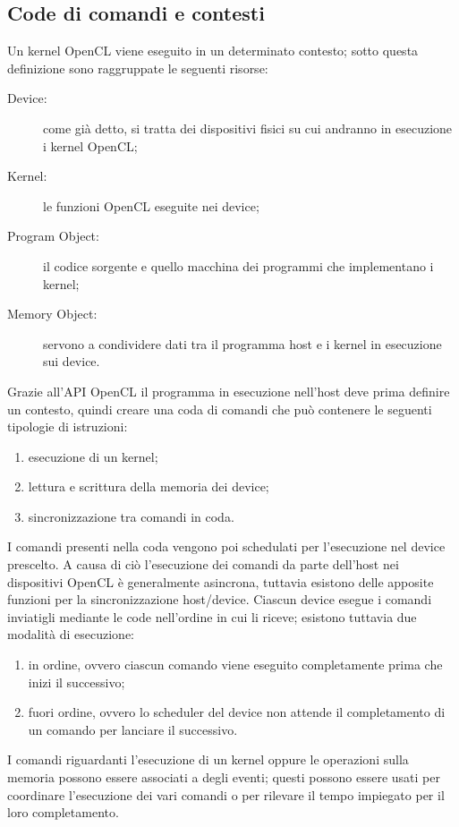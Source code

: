 \documentclass[12pt,a4paper,oneside]{book}
\begin{document}
\subsection{Code di comandi e contesti}
\label{sec:opencl-code-contesti}

Un kernel \ac{OpenCL} viene eseguito in un determinato contesto; sotto questa definizione sono raggruppate le seguenti risorse:
\begin{description}
\item[Device:] come già detto, si tratta dei dispositivi fisici su cui andranno in esecuzione i kernel \ac{OpenCL};
\item[Kernel:] le funzioni \ac{OpenCL} eseguite nei device;
\item[Program Object:] il codice sorgente e quello macchina dei programmi che implementano i kernel;
\item[Memory Object:] servono a condividere dati tra il programma host e i kernel in esecuzione sui device.
\end{description}

Grazie all'\ac{API} \ac{OpenCL} il programma in esecuzione nell'host deve prima definire un contesto, quindi creare una coda di comandi che può contenere le seguenti tipologie di istruzioni:
\begin{enumerate}
\item esecuzione di un kernel;
\item lettura e scrittura della memoria dei device;
\item sincronizzazione tra comandi in coda.
\end{enumerate}

I comandi presenti nella coda vengono poi schedulati per l'esecuzione nel device prescelto. A causa di ciò l'esecuzione dei comandi da parte dell'host nei dispositivi \ac{OpenCL} è generalmente asincrona, tuttavia esistono delle apposite funzioni per la sincronizzazione host/device. Ciascun device esegue i comandi inviatigli mediante le code nell'ordine in cui li riceve; esistono tuttavia due modalità di esecuzione:
\begin{enumerate}
\item in ordine, ovvero ciascun comando viene eseguito completamente prima che inizi il successivo;
\item fuori ordine, ovvero lo scheduler del device non attende il completamento di un comando per lanciare il successivo.
\end{enumerate}

I comandi riguardanti l'esecuzione di un kernel oppure le operazioni sulla memoria possono essere associati a degli eventi\label{pag:opencl-event}; questi possono essere usati per coordinare l'esecuzione dei vari comandi o per rilevare il tempo impiegato per il loro completamento.
\end{document}
